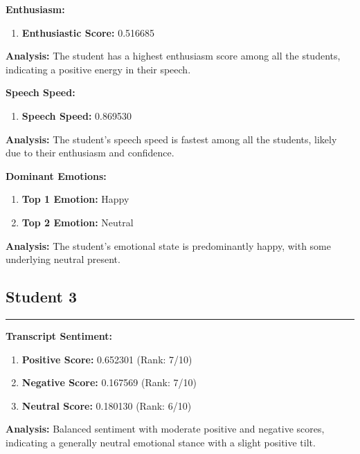 \documentclass{article}
\begin{document}
\large{\textbf{Enthusiasm:}}
\begin{tcolorbox}[colback=orange!10!white, colframe=orange!80!black, title=Enthusiastic Score]
    \begin{enumerate}
        \item \textbf{Enthusiastic Score:} \textcolor{orange!70!black}{0.516685}
    \end{enumerate}
\end{tcolorbox}
    \textbf{Analysis:} The student has a highest enthusiasm score among all the students, indicating a positive energy in their speech.

\large{\textbf{Speech Speed:}}
\begin{tcolorbox}[colback=purple!10!white, colframe=purple!80!black, title=Speech Speed]
    \begin{enumerate}
        \item \textbf{Speech Speed:} \textcolor{purple!70!black}{0.869530}
    \end{enumerate}
\end{tcolorbox}
    \textbf{Analysis:} The student's speech speed is fastest among all the students, likely due to their enthusiasm and confidence.

\large{\textbf{Dominant Emotions:}}
\begin{tcolorbox}[colback=pink!10!white, colframe=pink!80!black, title=Emotional State]
    \begin{enumerate}
        \item \textbf{Top 1 Emotion:} \textcolor{blue!80!black}{Happy}
        \item \textbf{Top 2 Emotion:} \textcolor{red!80!black}{Neutral}
    \end{enumerate}
\end{tcolorbox}
    \textbf{Analysis:} The student's emotional state is predominantly happy, with some underlying neutral present.

\subsection{Student 3}
\begin{center}
    \color{green}\rule{1\linewidth}{0.7mm}
\end{center}
\large{\textbf{Transcript Sentiment:}}
\begin{tcolorbox}[title=Sentiment Breakdown]
    \begin{enumerate}
        \item \textbf{Positive Score:} \textcolor{green!70!black}{0.652301} (Rank: 7/10)
        \item \textbf{Negative Score:} \textcolor{red!70!black}{0.167569} (Rank: 7/10)
        \item \textbf{Neutral Score:} \textcolor{blue!70!black}{0.180130} (Rank: 6/10)
    \end{enumerate}
\end{tcolorbox}
    \textbf{Analysis:} Balanced sentiment with moderate positive and negative scores, indicating a generally neutral emotional stance with a slight positive tilt.
\end{document}
